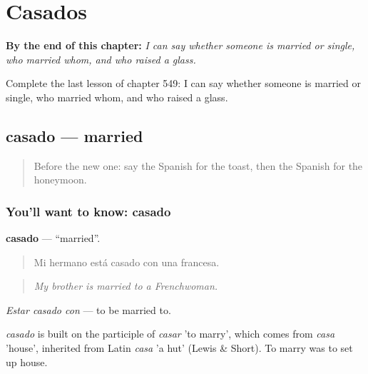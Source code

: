 
\chapter{Casados}
\label{ch:es-casados}

\begin{chapteropening}
\textbf{By the end of this chapter:} \emph{I can say whether someone is married or single, who married whom, and who raised a glass.}

Complete the last lesson of chapter 549: I can say whether someone is married or single, who married whom, and who raised a glass.
\end{chapteropening}

\section[casado]{casado — married}

\label{lesson:ES-C549-casado}



\begin{quote}
Before the new one: say the Spanish for the toast, then the Spanish for the honeymoon.
\end{quote}

\subsection*{You'll want to know: casado}
\textbf{casado} — \textquotedblleft{}married\textquotedblright{}.

\begin{quote}
Mi hermano está casado con una francesa.
\end{quote}

\begin{quote}
\emph{My brother is married to a Frenchwoman.}
\end{quote}

\emph{Estar casado con} — to be married to.

\begin{cousinweb}
\emph{casado} is built on the participle of \emph{casar} 'to marry', which comes from \emph{casa} 'house', inherited from Latin \emph{casa} 'a hut' (Lewis \& Short). To marry was to set up house.
\end{cousinweb}

